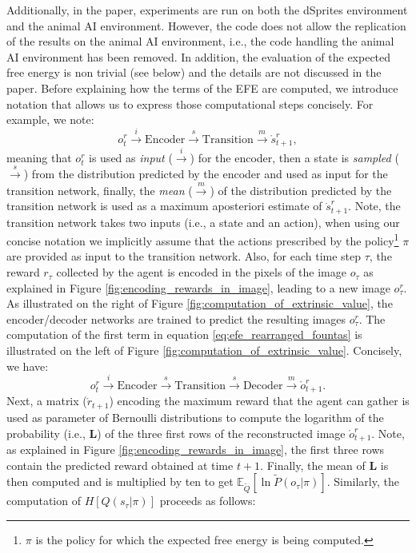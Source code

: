 \documentclass[twoside,11pt]{article}
\begin{document}
Additionally, in the paper, experiments are run on both the dSprites environment and the animal AI environment. However, the code does not allow the replication of the results on the animal AI environment, i.e., the code handling the animal AI environment has been removed. In addition, the evaluation of the expected free energy is non trivial (see below) and the details are not discussed in the paper. Before explaining how the terms of the EFE are computed, we introduce notation that allows us to express those computational steps concisely. For example, we note: 
$$o^r_t \overset{i}{\rightarrow} \text{Encoder} \overset{s}{\rightarrow} \text{Transition} \overset{m}{\rightarrow} \mathring{s}^r_{t+1},$$
meaning that $o^r_t$ is used as \textit{input} ($\overset{i}{\rightarrow}$) for the encoder, then a state is \textit{sampled} ($\overset{s}{\rightarrow}$) from the distribution predicted by the encoder and used as input for the transition network, finally, the \textit{mean} ($\overset{m}{\rightarrow}$) of the distribution predicted by the transition network is used as a maximum aposteriori estimate of $\mathring{s}^r_{t+1}$. Note, the transition network takes two inputs (i.e., a state and an action), when using our concise notation we implicitly assume that the actions prescribed by the policy\footnote{$\pi$ is the policy for which the expected free energy is being computed.} $\pi$ are provided as input to the transition network. Also, for each time step $\tau$, the reward $r_\tau$ collected by the agent is encoded in the pixels of the image $o_\tau$ as explained in Figure \ref{fig:encoding_rewards_in_image}, leading to a new image $o_\tau^r$. As illustrated on the right of Figure \ref{fig:computation_of_extrinsic_value}, the encoder/decoder networks are trained to predict the resulting images $o_\tau^r$. The computation of the first term in equation \eqref{eq:efe_rearranged_fountas} is illustrated on the left of Figure \ref{fig:computation_of_extrinsic_value}. Concisely, we have:
$$o_t^r \overset{i}{\rightarrow} \text{Encoder} \overset{s}{\rightarrow} \text{Transition} \overset{s}{\rightarrow} \text{Decoder} \overset{m}{\rightarrow} \mathring{o}_{t+1}^r.$$
Next, a matrix ($\mathring{r}_{t+1}$) encoding the maximum reward that the agent can gather is used as parameter of Bernoulli distributions to compute the logarithm of the probability (i.e., $\bm{L}$) of the three first rows of the reconstructed image $\mathring{o}_{t+1}^r$. Note, as explained in Figure \ref{fig:encoding_rewards_in_image}, the first three rows contain the predicted reward obtained at time $t+1$. Finally, the mean of $\bm{L}$ is then computed and is multiplied by ten to get $\mathbb{E}_{\tilde{Q}}[\ln \tilde{P}(o_\tau|\pi)]$. Similarly, the computation of $H[Q(s_\tau|\pi)]$ proceeds as follows:
\end{document}

